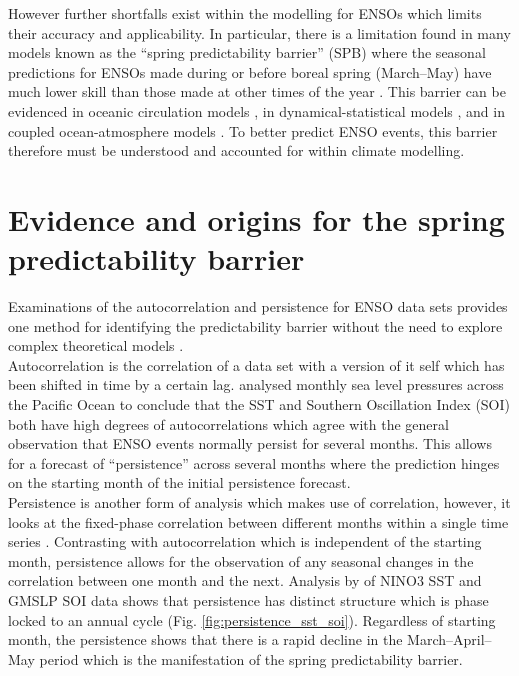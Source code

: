 \documentclass[12pt, onecolumn]{revtex4}    %
\begin{document}
However further shortfalls exist within the modelling for ENSOs which limits their accuracy and applicability. In particular, there is a limitation found in many models known as the ``spring predictability barrier'' (SPB) where the seasonal predictions for ENSOs made during or before boreal spring (March--May) have much lower skill than those made at other times of the year \citep{torrence1998annual}. This barrier can be evidenced in oceanic circulation models \citep{latif1992much}, in dynamical-statistical models \citep{balmaseda1994enso}, and in coupled ocean-atmosphere models \citep{goswami1991predictability, xue1994prediction}. To better predict ENSO events, this barrier therefore must be understood and accounted for within climate modelling.

\section{Evidence and origins for the spring predictability barrier}

Examinations of the autocorrelation and persistence for ENSO data sets provides one method for identifying the predictability barrier without the need to explore complex theoretical models \citep{torrence1998annual}. \\

Autocorrelation is the correlation of a data set with a version of it self which has been shifted in time by a certain lag. \cite{trenberth1976spatial} analysed monthly sea level pressures across the Pacific Ocean to conclude that the SST and Southern Oscillation Index (SOI) both have high degrees of autocorrelations which agree with the general observation that ENSO events normally persist for several months. This allows for a forecast of ``persistence'' across several months where the prediction hinges on the starting month of the initial persistence forecast. \\

Persistence is another form of analysis which makes use of correlation, however, it looks at the fixed-phase correlation between different months within a single time series \citep{troup1965southern}. Contrasting with autocorrelation which is independent of the starting month, persistence allows for the observation of any seasonal changes in the correlation between one month and the next. Analysis by \cite{torrence1998annual} of NINO3 SST and GMSLP SOI data shows that persistence has distinct structure which is phase locked to an annual cycle (Fig. \ref{fig:persistence_sst_soi}). Regardless of starting month, the persistence shows that there is a rapid decline in the March--April--May period which is the manifestation of the spring predictability barrier. \\
\end{document}

